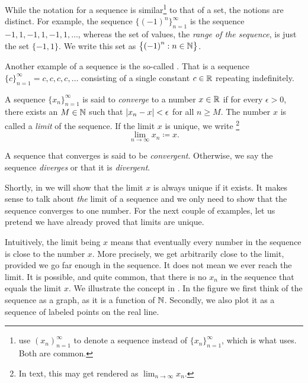 While the notation for a sequence
is similar\footnote{\cite{BS} use $(x_n)_{n=1}^\infty$ to denote
a sequence instead of $\{ x_n \}_{n=1}^\infty$, which is what \cite{Rudin:baby} uses.
Both are common.}
to that of a set, the notions are
distinct.  For example, the sequence $\bigl\{ {(-1)}^n \bigr\}_{n=1}^\infty$ is the sequence
$-1,1,-1,1,-1,1,\ldots$, whereas the set of values, the
\emph{range of the sequence},
is just the set $\{ -1, 1 \}$.  We write this set
as $\bigl\{ {(-1)}^n : n \in {\mathbb{N}} \bigr\}$.

Another example of a sequence is the so-called \emph{}.
That is a sequence $\{ c \}_{n=1}^\infty = c,c,c,c,\ldots$ consisting of a single
constant $c \in {\mathbb{R}}$ repeating indefinitely.


\begin{defn}
A sequence $\{ x_n \}_{n=1}^\infty$ is said to \emph{converge} to a number
$x \in {\mathbb{R}}$ if for every $\epsilon > 0$, there exists an $M \in {\mathbb{N}}$ such
that $\left\lvert {x_n - x} \right\rvert < \epsilon$ for all $n \geq M$.
The number $x$ is called a \emph{limit} of the sequence.
If the limit $x$ is unique, we write%
\footnote{In text, this may get rendered as $\lim_{n\to\infty} x_n$.}
%
\begin{equation*}
\lim_{n\to \infty} x_n \coloneqq x .
\end{equation*}

A sequence
that converges is said to be \emph{convergent}.
Otherwise, we say the sequence \emph{diverges}
or that it is
\emph{divergent}.
\end{defn}

Shortly, in  we will show that the limit $x$ is always
unique if it exists.  It makes sense to talk about \emph{the} limit of
a sequence and we only need to show that the sequence converges to one
number.
For the next couple of examples, let us pretend
we have already proved that limits are unique.

Intuitively, the limit being $x$ means that eventually
every number in the sequence is close to the number $x$.  More precisely,
we get arbitrarily close to the limit, provided we go far enough in the
sequence.  It does not mean we ever reach the limit.  It is possible,
and quite common, that there is no $x_n$ in the sequence that equals the
limit $x$.
We illustrate the concept in .  In the
figure we first think of the sequence as a graph, as it is a function of
${\mathbb{N}}$.   Secondly, we also plot it as a sequence of labeled points on the real
line.

